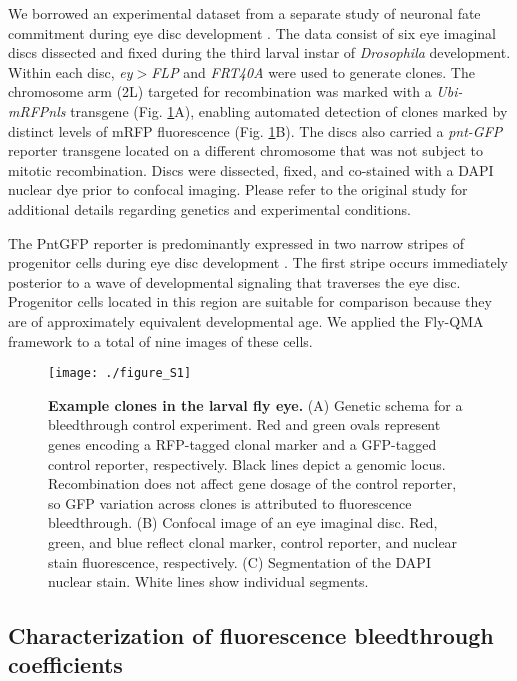 We borrowed an experimental dataset from a separate study of neuronal fate commitment during eye disc development \cite{Bernasek2018}. The data consist of six eye imaginal discs dissected and fixed during the third larval instar of \textit{Drosophila} development. Within each disc, \textit{ey$>$FLP} and \textit{FRT40A} were used to generate clones. The chromosome arm (2L) targeted for recombination was marked with a \textit{Ubi-mRFPnls} transgene (Fig. \ref{fig:figS1}A), enabling automated detection of clones marked by distinct levels of mRFP fluorescence (Fig. \ref{fig:figS1}B). The discs also carried a \textit{pnt-GFP} reporter transgene located on a different chromosome that was not subject to mitotic recombination. Discs were dissected, fixed, and co-stained with a DAPI nuclear dye prior to confocal imaging. Please refer to the original study for additional details regarding genetics and experimental conditions. 

The PntGFP reporter is predominantly expressed in two narrow stripes of progenitor cells during eye disc development \cite{Bernasek2018}. The first stripe occurs immediately posterior to a wave of developmental signaling that traverses the eye disc. Progenitor cells located in this region are suitable for comparison because they are of approximately equivalent developmental age. We applied the Fly-QMA framework to a total of nine images of these cells.

\begin{figure}[h!]
\texttt{[image: ./figure\_S1]}
\caption[Example clones in the larval fly eye.]{\textbf{Example clones in the larval fly eye.} (A) Genetic schema for a bleedthrough control experiment. Red and green ovals represent genes encoding a RFP-tagged clonal marker and a GFP-tagged control reporter, respectively. Black lines depict a genomic locus. Recombination does not affect gene dosage of the control reporter, so GFP variation across clones is attributed to fluorescence bleedthrough. (B) Confocal image of an eye imaginal disc. Red, green, and blue reflect clonal marker, control reporter, and nuclear stain fluorescence, respectively. (C) Segmentation of the DAPI nuclear stain. White lines show individual segments.}
\label{fig:figS1}
\end{figure}


\subsection{Characterization of fluorescence bleedthrough coefficients}

